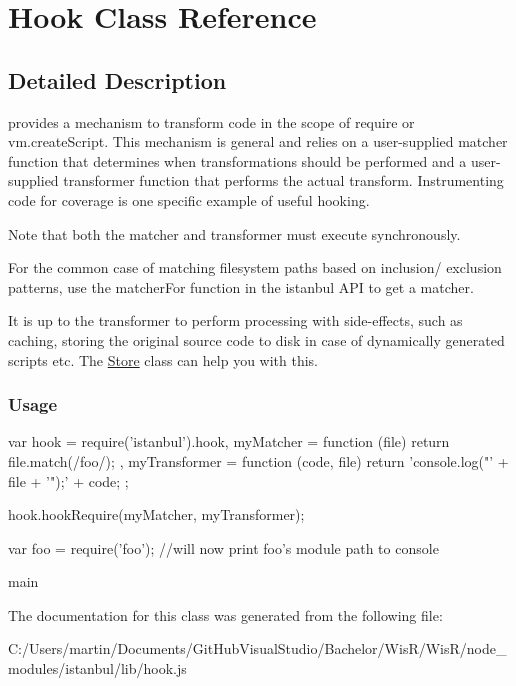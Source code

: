 \hypertarget{class_hook}{}\section{Hook Class Reference}
\label{class_hook}


\subsection{Detailed Description}
provides a mechanism to transform code in the scope of {\ttfamily require} or {\ttfamily vm.\+create\+Script}. This mechanism is general and relies on a user-\/supplied {\ttfamily matcher} function that determines when transformations should be performed and a user-\/supplied {\ttfamily transformer} function that performs the actual transform. Instrumenting code for coverage is one specific example of useful hooking.

Note that both the {\ttfamily matcher} and {\ttfamily transformer} must execute synchronously.

For the common case of matching filesystem paths based on inclusion/ exclusion patterns, use the {\ttfamily matcher\+For} function in the istanbul A\+P\+I to get a matcher.

It is up to the transformer to perform processing with side-\/effects, such as caching, storing the original source code to disk in case of dynamically generated scripts etc. The {\ttfamily \hyperlink{class_store}{Store}} class can help you with this.

\subsubsection*{Usage }

\begin{DoxyVerb} var hook = require('istanbul').hook,
     myMatcher = function (file) { return file.match(/foo/); },
     myTransformer = function (code, file) { return 'console.log("' + file + '");' + code; };

 hook.hookRequire(myMatcher, myTransformer);

 var foo = require('foo'); //will now print foo's module path to console
\end{DoxyVerb}


main 

The documentation for this class was generated from the following file\+:\begin{DoxyCompactItemize}
\item 
C\+:/\+Users/martin/\+Documents/\+Git\+Hub\+Visual\+Studio/\+Bachelor/\+Wis\+R/\+Wis\+R/node\+\_\+modules/istanbul/lib/hook.\+js\end{DoxyCompactItemize}
